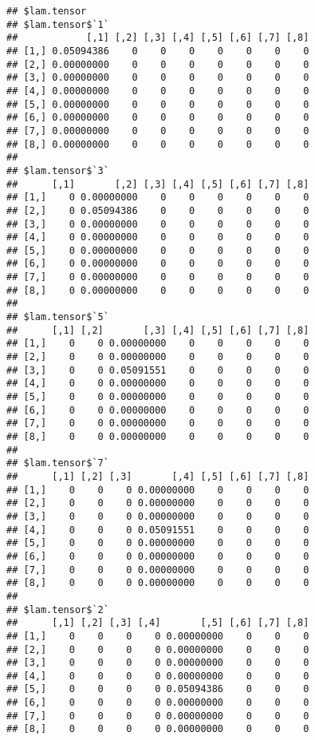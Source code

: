\documentclass[
]{article}
\begin{document}
\begin{verbatim}
## $lam.tensor
## $lam.tensor$`1`
##            [,1] [,2] [,3] [,4] [,5] [,6] [,7] [,8]
## [1,] 0.05094386    0    0    0    0    0    0    0
## [2,] 0.00000000    0    0    0    0    0    0    0
## [3,] 0.00000000    0    0    0    0    0    0    0
## [4,] 0.00000000    0    0    0    0    0    0    0
## [5,] 0.00000000    0    0    0    0    0    0    0
## [6,] 0.00000000    0    0    0    0    0    0    0
## [7,] 0.00000000    0    0    0    0    0    0    0
## [8,] 0.00000000    0    0    0    0    0    0    0
## 
## $lam.tensor$`3`
##      [,1]       [,2] [,3] [,4] [,5] [,6] [,7] [,8]
## [1,]    0 0.00000000    0    0    0    0    0    0
## [2,]    0 0.05094386    0    0    0    0    0    0
## [3,]    0 0.00000000    0    0    0    0    0    0
## [4,]    0 0.00000000    0    0    0    0    0    0
## [5,]    0 0.00000000    0    0    0    0    0    0
## [6,]    0 0.00000000    0    0    0    0    0    0
## [7,]    0 0.00000000    0    0    0    0    0    0
## [8,]    0 0.00000000    0    0    0    0    0    0
## 
## $lam.tensor$`5`
##      [,1] [,2]       [,3] [,4] [,5] [,6] [,7] [,8]
## [1,]    0    0 0.00000000    0    0    0    0    0
## [2,]    0    0 0.00000000    0    0    0    0    0
## [3,]    0    0 0.05091551    0    0    0    0    0
## [4,]    0    0 0.00000000    0    0    0    0    0
## [5,]    0    0 0.00000000    0    0    0    0    0
## [6,]    0    0 0.00000000    0    0    0    0    0
## [7,]    0    0 0.00000000    0    0    0    0    0
## [8,]    0    0 0.00000000    0    0    0    0    0
## 
## $lam.tensor$`7`
##      [,1] [,2] [,3]       [,4] [,5] [,6] [,7] [,8]
## [1,]    0    0    0 0.00000000    0    0    0    0
## [2,]    0    0    0 0.00000000    0    0    0    0
## [3,]    0    0    0 0.00000000    0    0    0    0
## [4,]    0    0    0 0.05091551    0    0    0    0
## [5,]    0    0    0 0.00000000    0    0    0    0
## [6,]    0    0    0 0.00000000    0    0    0    0
## [7,]    0    0    0 0.00000000    0    0    0    0
## [8,]    0    0    0 0.00000000    0    0    0    0
## 
## $lam.tensor$`2`
##      [,1] [,2] [,3] [,4]       [,5] [,6] [,7] [,8]
## [1,]    0    0    0    0 0.00000000    0    0    0
## [2,]    0    0    0    0 0.00000000    0    0    0
## [3,]    0    0    0    0 0.00000000    0    0    0
## [4,]    0    0    0    0 0.00000000    0    0    0
## [5,]    0    0    0    0 0.05094386    0    0    0
## [6,]    0    0    0    0 0.00000000    0    0    0
## [7,]    0    0    0    0 0.00000000    0    0    0
## [8,]    0    0    0    0 0.00000000    0    0    0

\end{verbatim}
\end{document}
